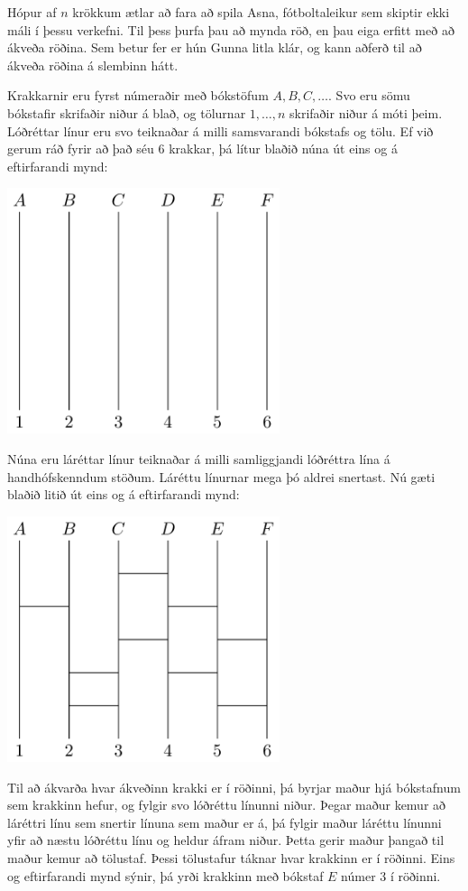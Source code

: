 
Hópur af $n$ krökkum ætlar að fara að spila Asna, fótboltaleikur sem skiptir
ekki máli í þessu verkefni. Til þess þurfa þau að mynda röð, en þau eiga erfitt
með að ákveða röðina. Sem betur fer er hún Gunna litla klár, og kann aðferð til
að ákveða röðina á slembinn hátt.

Krakkarnir eru fyrst númeraðir með bókstöfum $A, B, C, \ldots$. Svo eru sömu
bókstafir skrifaðir niður á blað, og tölurnar $1,\ldots,n$ skrifaðir niður á
móti þeim. Lóðréttar línur eru svo teiknaðar á milli samsvarandi bókstafs og
tölu. Ef við gerum ráð fyrir að það séu $6$ krakkar, þá lítur blaðið núna út
eins og á eftirfarandi mynd:

\includegraphics[width=0.6\textwidth]{empty.png}

Núna eru láréttar línur teiknaðar á milli samliggjandi lóðréttra lína á
handhófskenndum stöðum. Láréttu línurnar mega þó aldrei snertast. Nú gæti
blaðið litið út eins og á eftirfarandi mynd:

\includegraphics[width=0.6\textwidth]{with_lines.png}

Til að ákvarða hvar ákveðinn krakki er í röðinni, þá byrjar maður hjá
bókstafnum sem krakkinn hefur, og fylgir svo lóðréttu línunni niður. Þegar
maður kemur að láréttri línu sem snertir línuna sem maður er á, þá fylgir maður
láréttu línunni yfir að næstu lóðréttu línu og heldur áfram niður. Þetta gerir
maður þangað til maður kemur að tölustaf. Þessi tölustafur táknar hvar krakkinn
er í röðinni. Eins og eftirfarandi mynd sýnir, þá yrði krakkinn með bókstaf $E$
númer $3$ í röðinni.


